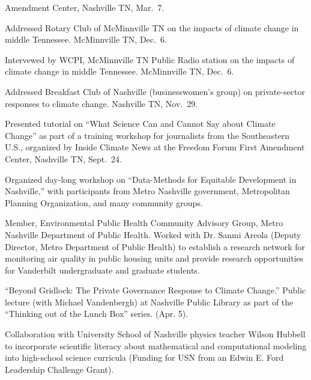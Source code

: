   Amendment Center, Nashville TN, Mar.~7.
\item[2018] Addressed Rotary Club of McMinnville TN on the impacts of climate
  change in middle Tennessee. McMinnville TN, Dec.\ 6.
\item[2018] Intervewed by WCPI, McMinnville TN Public Radio station on the
  impacts of climate change in middle Tennessee. McMinnville TN, Dec.\ 6.
\item[2018] Addressed Breakfast Club of Nashville (businesswomen's group) on
  private-sector responses to climate change. Nashville TN, Nov.\ 29.
\item[2018] Presented tutorial on ``What Science Can and Cannot Say about
  Climate Change'' as part of a training workshop for journalists from the
  Southeastern U.S., organized by Inside Climate News at the Freedom Forum
  First Amendment Center, Nashville TN, Sept.~24.
\item[2018] Organized day-long workshop on ``Data-Methods for Equitable
  Development in Nashville,'' with participants from Metro Nashville
  government, Metropolitan Planning Organization,
  and many community groups.
\item[2017--2019] Member, Environmental Public Health Community Advisory
  Group, Metro Nashville Department of Public Health. Worked with Dr. Sanmi
  Areola (Deputy Director, Metro Department of Public Health)
  to establish a research network for monitoring air quality in public housing
  units and provide research opportunities for Vanderbilt undergraduate and
  graduate students.
\item[2017] ``Beyond Gridlock: The Private Governance Response to Climate
  Change.'' Public lecture (with Michael Vandenbergh) at Nashville Public
  Library as part of the ``Thinking out of the Lunch Box'' series. (Apr. 5).
\item[2015--2017] Collaboration with University School of Nashville physics
  teacher Wilson Hubbell to incorporate scientific literacy about mathematical
  and computational modeling into high-school science curricula (Funding for
  USN from an Edwin E. Ford Leadership Challenge Grant).

